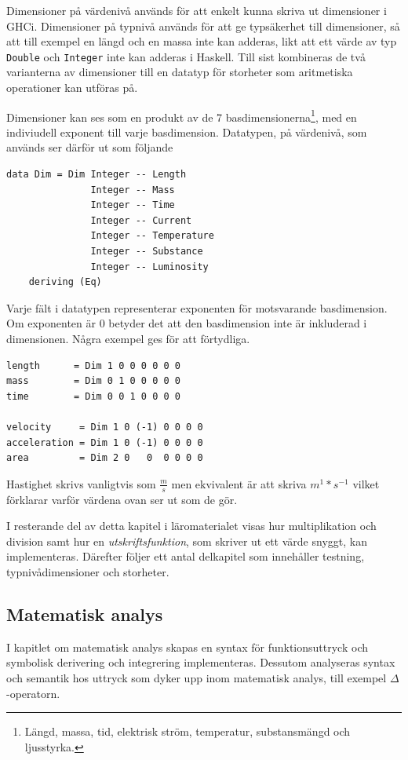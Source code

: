 Dimensioner på värdenivå används för att enkelt kunna skriva ut dimensioner i
GHCi. Dimensioner på typnivå används för att ge typsäkerhet till dimensioner, så
att till exempel en längd och en massa inte kan adderas, likt att ett värde av
typ \texttt{Double} och \texttt{Integer} inte kan adderas i Haskell. Till sist
kombineras de två varianterna av dimensioner till en datatyp för storheter som
aritmetiska operationer kan utföras på.

Dimensioner kan ses som en produkt av de 7 basdimensionerna\footnote{Längd,
massa, tid, elektrisk ström, temperatur, substansmängd och ljusstyrka.}, med en
indiviudell exponent till varje basdimension. Datatypen, på värdenivå, som
används ser därför ut som följande

\begin{lstlisting}
data Dim = Dim Integer -- Length
               Integer -- Mass
               Integer -- Time
               Integer -- Current
               Integer -- Temperature
               Integer -- Substance
               Integer -- Luminosity
    deriving (Eq)
\end{lstlisting}

Varje fält i datatypen representerar exponenten för motsvarande basdimension. Om
exponenten är $0$ betyder det att den basdimension inte är inkluderad i
dimensionen. Några exempel ges för att förtydliga.

\begin{lstlisting}
length      = Dim 1 0 0 0 0 0 0
mass        = Dim 0 1 0 0 0 0 0
time        = Dim 0 0 1 0 0 0 0

velocity     = Dim 1 0 (-1) 0 0 0 0
acceleration = Dim 1 0 (-1) 0 0 0 0
area         = Dim 2 0   0  0 0 0 0
\end{lstlisting}

Hastighet skrivs vanligtvis som $\frac{m}{s}$ men ekvivalent är att skriva
$m^1*s^{-1}$ vilket förklarar varför värdena ovan ser ut som de gör.

I resterande del av detta kapitel i läromaterialet visas hur multiplikation och
division samt hur en \textit{utskriftsfunktion}, som skriver ut ett värde
snyggt, kan implementeras. Därefter följer ett antal delkapitel som innehåller
testning, typnivådimensioner och storheter.

\subsection{Matematisk analys}

I kapitlet om matematisk analys skapas en syntax för funktionsuttryck och symbolisk derivering och integrering implementeras. Dessutom analyseras syntax och semantik hos uttryck som dyker upp inom matematisk analys, till exempel $\Delta$-operatorn.

